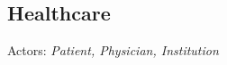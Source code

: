 \begin{comment}
                          & \rule{0pt}{4ex} Granularity & & \\ [12pt]\hline\hline
\multirow{6}{*}{\centerline{\textbf{System}}} & \rule{0pt}{4ex} Scalability & \rule{0pt}{3ex}\hspace{55pt}x & \rule{0pt}{3ex}\hspace{55pt}x \\ [12pt]\cline{2-4}
                          & \rule{-2pt}{4ex} Interoperability & \rule{0pt}{3ex}\hspace{55pt}x & \\ [12pt]\cline{2-4} 
                          & \rule{0pt}{4ex} Trust & \rule{0pt}{3ex}\hspace{55pt}x & \rule{0pt}{3ex}\hspace{55pt}x \\ [12pt]\hline\hline
                          & \rule{0pt}{4ex} Confidentiality & \rule{0pt}{3ex}\hspace{55pt}x & \rule{0pt}{3ex}\hspace{55pt}x \\ [12pt]\cline{2-4}

\textbf{Security}         & \rule{0pt}{4ex} Integrity & \rule{0pt}{3ex}\hspace{55pt}x & \\ [12pt]\cline{2-4}
                          & \rule{0pt}{4ex} Availability & \rule{0pt}{3ex}\hspace{55pt}x & \\ [12pt]\hline\hline
\multirow{6}{*}{\centerline{\textbf{Other}}} & \rule{0pt}{4ex} Policies & \rule{0pt}{3ex}\hspace{55pt}x & \\ [12pt]\cline{2-4}
                          & \rule{0pt}{4ex} Usability & & \\ [12pt]\hline
\end{tabular}
\end{center}
\end{comment}

\subsection{Healthcare}
\label{ssec:healthcare}

Actors: \textit{Patient, Physician, Institution} \newline

